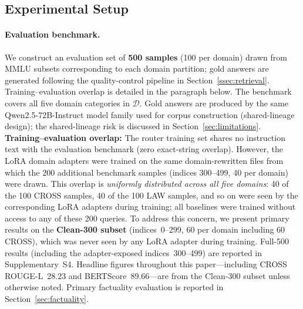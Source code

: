 \documentclass[a4paper,fleql]{cas-sc}
\begin{document}
\subsection{Experimental Setup}
\label{ssec:setup}
\paragraph{Evaluation benchmark.}
We construct an evaluation set of \textbf{500 samples} (100 per domain) drawn
from MMLU subsets corresponding to each domain partition; gold answers are
generated following the quality-control pipeline in Section~\ref{ssec:retrieval}.
Training--evaluation overlap is detailed in the paragraph below.
The benchmark covers all five domain categories in $\mathcal{D}$.
Gold answers are produced by the same Qwen2.5-72B-Instruct model family
used for corpus construction (shared-lineage design); the shared-lineage
risk is discussed in Section~\ref{sec:limitations}.
\textbf{Training--evaluation overlap:} The router training set shares no
instruction text with the evaluation benchmark (zero exact-string overlap).
However, the LoRA domain adapters were trained on the same domain-rewritten
files from which the 200 additional benchmark samples (indices 300--499,
40 per domain) were drawn.
This overlap is \emph{uniformly distributed across all five domains}: 40 of
the 100 CROSS samples, 40 of the 100 LAW samples, and so on were seen by the
corresponding LoRA adapters during training; all baselines were trained without
access to any of these 200 queries.
To address this concern, we present primary results on the \textbf{Clean-300 subset} (indices~0--299, 60 per domain including 60 CROSS), which was never seen by any LoRA adapter during training. Full-500 results (including the adapter-exposed indices~300--499) are reported in Supplementary~S4. Headline figures throughout this paper---including CROSS ROUGE-L~28.23 and BERTScore~89.66---are from the Clean-300 subset unless otherwise noted.
Primary factuality evaluation is reported in Section~\ref{sec:factuality}.
\end{document}
